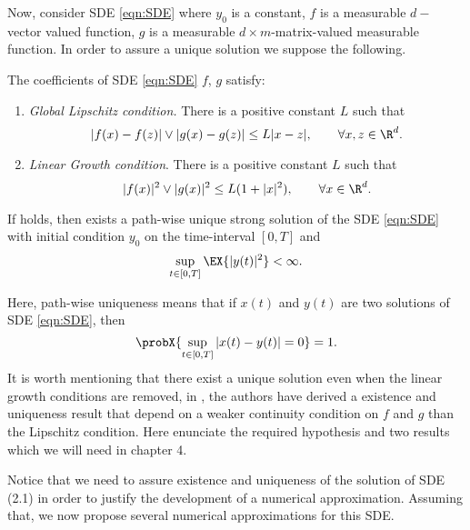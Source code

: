 Now,  consider SDE \eqref{eqn:SDE} where $y_0$ is a constant, $f$ is a measurable
$d-$vector valued function, $g$ is a measurable $d\times m$-matrix-valued measurable function.
In order to assure a unique solution we suppose the following.
\begin{hypothesis}\label{ass:ClassicExisAndUniqueness}
		The coefficients of SDE \eqref{eqn:SDE} $f$, $g$ satisfy: 
	\begin{enumerate}[(EU1)]
		\item \emph{Global Lipschitz condition.}
			There is a positive constant $L$ such that
			$$
				|f(x)-f(z)| \vee |g(x)-g(z)|\leq L|x-z|, \qquad \forall x,z \in \R^d.
			$$
		\item \emph{Linear Growth condition}. There is a positive constant $L$ such that
			$$
				|f(x)|^ 2 \vee |g(x)|^ 2 \leq L(1+|x|^2), \qquad \forall x \in \R^d.
			$$
	\end{enumerate}
\end{hypothesis}
\begin{thm}
	If  holds, then exists a path-wise unique strong solution of the SDE
	\eqref{eqn:SDE} with initial condition $y_0$ on the time-interval $[0, T]$ and
	\begin{equation}
		\sup_{t\in [0,T]} \EX{|y(t)|^2} < \infty.
	\end{equation}
\end{thm}
	Here, path-wise uniqueness means that if $x(t)$ and $y(t)$ are two solutions of SDE \eqref{eqn:SDE}, then
	$$
		\probX{
			\sup_{t\in [0,T]}
				|x(t)-y(t)|=0
			}=1.
	$$
	It is worth mentioning that  there exist a unique solution even when the linear growth conditions are removed, in
\cite{Higham2002b}, the authors have derived a existence and uniqueness result that depend on a weaker
continuity condition on $f$ and $g$ than the Lipschitz condition. Here enunciate the required hypothesis and two results
which we will need in chapter 4.


Notice that we need to  assure  existence and uniqueness of the solution  of  SDE (2.1)  in order to justify the 
development of a numerical approximation.  Assuming that,  we now propose several numerical approximations for  this 
SDE.
